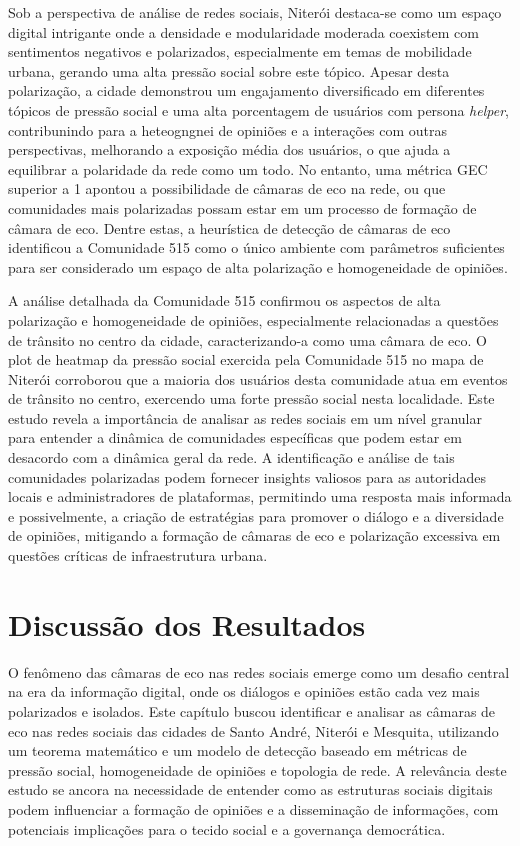 Sob a perspectiva de análise de redes sociais, Niterói destaca-se como um espaço digital intrigante onde a densidade e modularidade moderada coexistem com sentimentos negativos e polarizados, especialmente em temas de mobilidade urbana, gerando uma alta pressão social sobre este tópico. Apesar desta polarização, a cidade demonstrou um engajamento diversificado em diferentes tópicos de pressão social e uma alta porcentagem de usuários com persona \textit{helper}, contribunindo para a heteogngnei de opiniões e a interações com outras perspectivas, melhorando a exposição média dos usuários, o que ajuda a equilibrar a polaridade da rede como um todo. No entanto, uma métrica GEC superior a 1 apontou a possibilidade de câmaras de eco na rede, ou que comunidades mais polarizadas possam estar em um processo de formação de câmara de eco. Dentre estas, a heurística de detecção de câmaras de eco identificou a Comunidade 515 como o único ambiente com parâmetros suficientes para ser considerado um espaço de alta polarização e homogeneidade de opiniões.

A análise detalhada da Comunidade 515 confirmou os aspectos de alta polarização e homogeneidade de opiniões, especialmente relacionadas a questões de trânsito no centro da cidade, caracterizando-a como uma câmara de eco. O plot de heatmap da pressão social exercida pela Comunidade 515 no mapa de Niterói corroborou que a maioria dos usuários desta comunidade atua em eventos de trânsito no centro, exercendo uma forte pressão social nesta localidade. Este estudo revela a importância de analisar as redes sociais em um nível granular para entender a dinâmica de comunidades específicas que podem estar em desacordo com a dinâmica geral da rede. A identificação e análise de tais comunidades polarizadas podem fornecer insights valiosos para as autoridades locais e administradores de plataformas, permitindo uma resposta mais informada e possivelmente, a criação de estratégias para promover o diálogo e a diversidade de opiniões, mitigando a formação de câmaras de eco e polarização excessiva em questões críticas de infraestrutura urbana.

\section{Discussão dos Resultados}

O fenômeno das câmaras de eco nas redes sociais emerge como um desafio central na era da informação digital, onde os diálogos e opiniões estão cada vez mais polarizados e isolados. Este capítulo buscou identificar e analisar as câmaras de eco nas redes sociais das cidades de Santo André, Niterói e Mesquita, utilizando um teorema matemático e um modelo de detecção baseado em métricas de pressão social, homogeneidade de opiniões e topologia de rede. A relevância deste estudo se ancora na necessidade de entender como as estruturas sociais digitais podem influenciar a formação de opiniões e a disseminação de informações, com potenciais implicações para o tecido social e a governança democrática.


